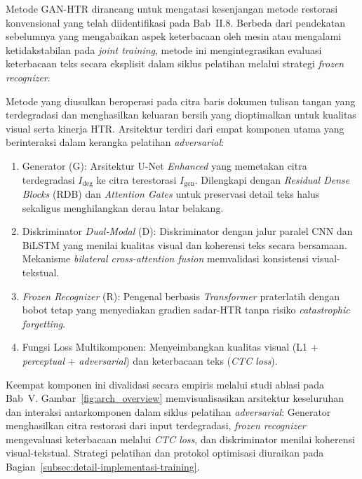 \documentclass[12pt,a4paper]{article}
\begin{document}
Metode GAN-HTR dirancang untuk mengatasi kesenjangan metode restorasi konvensional yang telah diidentifikasi pada Bab~II.8. Berbeda dari pendekatan sebelumnya yang mengabaikan aspek keterbacaan oleh mesin atau mengalami ketidakstabilan pada \textit{joint training}, metode ini mengintegrasikan evaluasi keterbacaan teks secara eksplisit dalam siklus pelatihan melalui strategi \textit{frozen recognizer}.

Metode yang diusulkan beroperasi pada citra baris dokumen tulisan tangan yang terdegradasi dan menghasilkan keluaran bersih yang dioptimalkan untuk kualitas visual serta kinerja HTR. Arsitektur terdiri dari empat komponen utama yang berinteraksi dalam kerangka pelatihan \textit{adversarial}:

\begin{enumerate}[leftmargin=1.5em, labelsep=0.5em, itemindent=0pt, noitemsep, topsep=0pt]
  \item Generator (G): Arsitektur U-Net \textit{Enhanced} yang memetakan citra terdegradasi $I_{\text{deg}}$ ke citra terestorasi $I_{\text{gen}}$. Dilengkapi dengan \textit{Residual Dense Blocks} (RDB) dan \textit{Attention Gates} untuk preservasi detail teks halus sekaligus menghilangkan derau latar belakang.
  \item Diskriminator \textit{Dual-Modal} (D): Diskriminator dengan jalur paralel CNN dan BiLSTM yang menilai kualitas visual dan koherensi teks secara bersamaan. Mekanisme \textit{bilateral cross-attention fusion} memvalidasi konsistensi visual-tekstual.
  \item \textit{Frozen Recognizer} (R): Pengenal berbasis \textit{Transformer} praterlatih dengan bobot tetap yang menyediakan gradien sadar-HTR tanpa risiko \textit{catastrophic forgetting}.
  \item Fungsi Loss Multikomponen: Menyeimbangkan kualitas visual (L1 + \textit{perceptual} + \textit{adversarial}) dan keterbacaan teks (\textit{CTC loss}).
\end{enumerate}

\noindent Keempat komponen ini divalidasi secara empiris melalui studi ablasi pada Bab~V. Gambar~\ref{fig:arch_overview} memvisualisasikan arsitektur keseluruhan dan interaksi antarkomponen dalam siklus pelatihan \textit{adversarial}: Generator menghasilkan citra restorasi dari input terdegradasi, \textit{frozen recognizer} mengevaluasi keterbacaan melalui \textit{CTC loss}, dan diskriminator menilai koherensi visual-tekstual. Strategi pelatihan dan protokol optimisasi diuraikan pada Bagian~\ref{subsec:detail-implementasi-training}.
\end{document}
